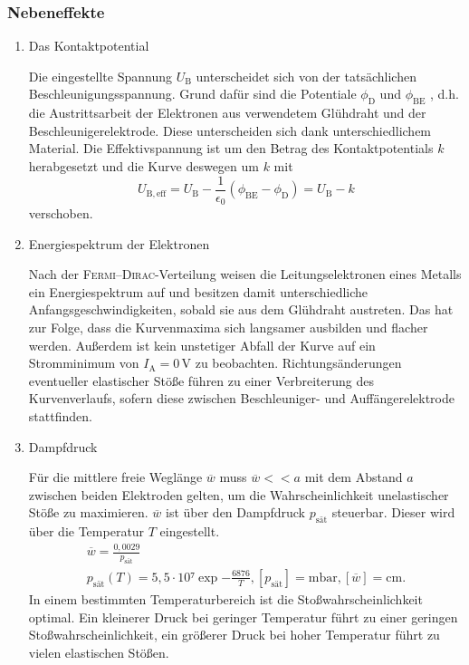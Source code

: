 \subsubsection{Nebeneffekte}
\begin{enumerate}
\item{Das Kontaktpotential}

Die eingestellte Spannung $U_\mathup{B}$ unterscheidet sich von der tatsächlichen Beschleunigungsspannung. 
Grund dafür sind die Potentiale $\phi_\mathup{D}$ und $\phi_\mathup{BE}$ , d.h. die Austrittsarbeit der Elektronen aus verwendetem Glühdraht und der Beschleunigerelektrode. 
Diese unterscheiden sich dank unterschiedlichem Material.
Die Effektivspannung ist um den Betrag des Kontaktpotentials $k$ herabgesetzt und die Kurve deswegen um $k$ mit
\begin{equation}
	U_\mathup{B,eff}=U_\mathup{B}-\frac{1}{\epsilon_0}(\phi_\mathup{BE}-\phi_\mathup{D})=U_\mathup{B}-k
\end{equation}
verschoben.
\item{Energiespektrum der Elektronen}

Nach der \textsc{Fermi}--\textsc{Dirac}-Verteilung weisen die Leitungselektronen eines Metalls ein Energiespektrum auf und besitzen damit unterschiedliche Anfangsgeschwindigkeiten, sobald sie aus dem Glühdraht austreten.
Das hat zur Folge, dass die Kurvenmaxima sich langsamer ausbilden und flacher werden. 
Außerdem ist kein unstetiger Abfall der Kurve auf ein Stromminimum von $I_\mathup{A}=0\,\si\volt$ zu beobachten.
Richtungsänderungen eventueller elastischer Stöße führen zu einer Verbreiterung des Kurvenverlaufs, sofern diese zwischen Beschleuniger- und Auffängerelektrode stattfinden. 
\item{Dampfdruck}

Für die mittlere freie Weglänge $\overline{w}$ muss $\overline{w} << a$ mit dem Abstand $a$ zwischen beiden Elektroden gelten, um die Wahrscheinlichkeit unelastischer Stöße zu maximieren. 
$\overline{w}$ ist über den Dampfdruck $p_\mathup{sät}$ steuerbar. Dieser wird über die Temperatur $T$ eingestellt. 
\begin{align}
	\overline{w}=\frac{0,0029}{p_\mathup{sät}}\qquad\\
	p_\mathup{sät}(T)=5,5\cdot 10⁷\exp{-\frac{6876}{T}}, [p_\mathup{sät}]=\si{\milli\bar}, [\overline{w}]=\si{\centi\meter}.
\end{align}
In einem bestimmten Temperaturbereich ist die Stoßwahrscheinlichkeit optimal.
Ein kleinerer Druck bei geringer Temperatur führt zu einer geringen Stoßwahrscheinlichkeit, ein größerer Druck bei hoher Temperatur führt zu vielen elastischen Stößen.
\end{enumerate}
